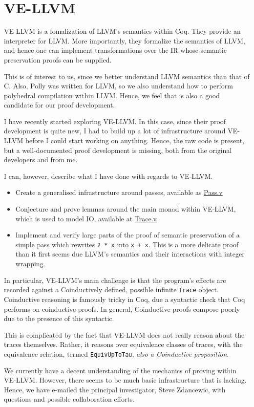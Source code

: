 \documentclass{article}
\begin{document}
\section{VE-LLVM}
VE-LLVM is a fomalization of LLVM's semantics within Coq. They provide an interpreter for LLVM. More importantly, they formalize
the semantics of LLVM, and hence one can implement transformations over the IR whose semantic preservation proofs can be
supplied.

This is  of interest to us, since we better
understand LLVM semantics than that of C. Also, Polly was written for LLVM, so we also understand how to 
perform polyhedral compilation within LLVM. Hence, we feel that is also a good candidate for our proof
development.

I have recently started exploring VE-LLVM. In this case, since their proof development is quite new, I had to build
up a lot of infrastructure around VE-LLVM before I could start working on anything. Hence, the
raw code is present, but a well-documented proof development is missing, both from the original developers and
from me. 

I can, however, describe what I have done with regards to VE-LLVM.
\begin{itemize}
	\item Create a generalised infrastructure around passes, available as \href{}{Pass.v}
	\item Conjecture and prove lemmas around the main monad within VE-LLVM, which is
	      used to model IO, available at \href{}{Trace.v}
	\item Implement and verify large parts of the proof of semantic preservation of a simple
	      pass which rewrites \texttt{2 * x} into \texttt{x + x}. This is a more delicate proof
	      than it first seems due LLVM's semantics and their interactions with integer wrapping.
\end{itemize}

In particular, VE-LLVM's main challenge is that the program's effects are recorded against a Coinductively
defined, possible infinite \texttt{Trace} object. Coinductive reasoning is famously tricky in Coq, due
a syntactic check that Coq performs on coinductive proofs. In general, Coinductive proofs compose poorly
due to the presence of this syntactic.

This is complicated by the fact that VE-LLVM does not really reason about the traces themselves. Rather,
it reasons over equivalence classes of traces, with the equivalence relation, termed \texttt{EquivUpToTau},
\textit{also a Coinductive proposition}.

We currently have a decent understanding of the mechanics of proving within VE-LLVM. However, there seems to be
much basic infrastructure that is lacking. Hence, we have e-mailed the principal investigator,
Steve Zdancewic, with questions and possible collaboration efforts.
\end{document}
